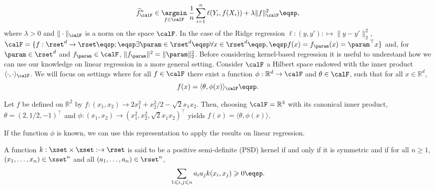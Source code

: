 \begin{equation}
\label{eq:erm:rkhs}
\widehat f^n_{\calF} \in \underset{f\in\calF}{\argmin}\; \frac{1}{n}\sum_{i=1}^n \ell(Y_i,f(X_i)) + \lambda\|f\|_\calF^2\eqsp,
\end{equation}
where $\lambda>0$ and $\|\cdot\|_\calF$ is a norm on the space $\calF$.  In the case of the Ridge regression $\ell:(y,y'): \mapsto \|y-y'\|_2^2$, $\calF = \{f: \rset^d\to\rset\eqsp;\eqsp \exists \param\in\rset^d \eqsp\forall x\in \rset^d\eqsp, \eqsp f(x) =f_\param(x)= \param^\top x\}$ and, for $\param\in\rset^d$ and $f_\param\in\calF$,  $\|f_\param\|^2 = \|\param\|_2^2$. Before considering kernel-based regression it is useful to understand how we can use our knowledge on linear regression in a more general setting. Consider $\calF$ a Hilbert space endowed with the inner product $\langle \cdot,\cdot\rangle_\calF$. We will focus on settings where for all $f\in\calF$  there exist a function $\phi:\mathbb{R}^d \to \calF$ and $\theta\in\calF$, such that for all $x\in\mathbb{R}^d$,
$$
f(x) = \langle \theta,\phi(x)\rangle_\calF\eqsp.
$$
\begin{example}
Let $f$ be defined on $\mathbb{R}^2$ by $f:(x_1, x_2)\to 2x_1^2 + x_2^2/2 - \sqrt{2} x_1x_2$.  Then, choosing $\calF = \mathbb{R}^3$ with its canonical inner product, $\theta = (2,1/2,-1)^\top$ and $\phi:(x_1, x_2)\to (x_1^2,x_2^2,\sqrt{2}x_1x_2)^\top$ yields $f(x) = \langle \theta,\phi(x)\rangle$.
\end{example}
If the function $\phi$ is known, we can use this representation to apply the results on linear regression. 

\begin{shaded}
\begin{definition}
\label{def:kernel}
A function $k:\xset\times\xset:\to \rset$ is said to be a positive semi-definite (PSD) kernel if and only if it is symmetric and if for all $n\geqslant 1$, $(x_1,\ldots,x_n)\in\xset^n$ and all $(a_1,\ldots,a_n)\in\rset^n$,
\[
\sum_{1\leqslant i,j\leqslant n}a_ia_jk(x_i,x_j) \geqslant 0\eqsp.
\]
\end{definition}
\end{shaded}

